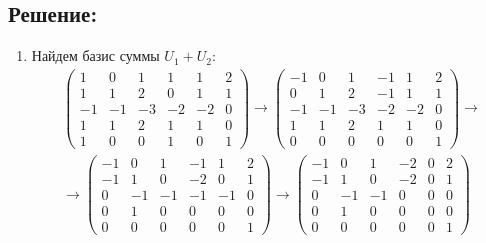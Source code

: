 \documentclass[12pt]{article}
\begin{document}
    \subsection*{Решение:}
    \begin{enumerate}
        \item
        Найдем базис суммы $U_1 + U_2$:
        \begin{gather*}
            \begin{pmatrix}
                1  & 0  & 1  & 1  & 1  & 2 \\
                1  & 1  & 2  & 0  & 1  & 1 \\
                -1 & -1 & -3 & -2 & -2 & 0 \\
                1  & 1  & 2  & 1  & 1  & 0 \\
                1  & 0  & 0  & 1  & 0  & 1
            \end{pmatrix}
            \rightarrow
            \begin{pmatrix}
                -1 & 0  & 1  & -1 & 1  & 2 \\
                0  & 1  & 2  & -1 & 1  & 1 \\
                -1 & -1 & -3 & -2 & -2 & 0 \\
                1  & 1  & 2  & 1  & 1  & 0 \\
                0  & 0  & 0  & 0  & 0  & 1
            \end{pmatrix}
            \rightarrow \\
            \rightarrow
            \begin{pmatrix}
                -1 & 0  & 1  & -1 & 1  & 2 \\
                -1 & 1  & 0  & -2 & 0  & 1 \\
                0  & -1 & -1 & -1 & -1 & 0 \\
                0  & 1  & 0  & 0  & 0  & 0 \\
                0  & 0  & 0  & 0  & 0  & 1
            \end{pmatrix}
            \rightarrow
            \begin{pmatrix}
                -1 & 0  & 1  & -2 & 0 & 2 \\
                -1 & 1  & 0  & -2 & 0 & 1 \\
                0  & -1 & -1 & 0  & 0 & 0 \\
                0  & 1  & 0  & 0  & 0 & 0 \\
                0  & 0  & 0  & 0  & 0 & 1
            \end{pmatrix}

\end{gather*}
\end{enumerate}
\end{document}

